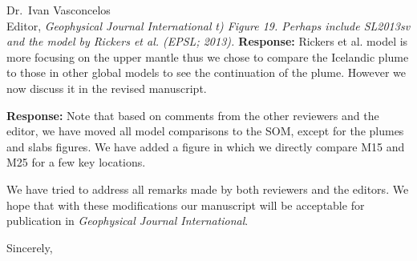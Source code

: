 \documentclass[11pt,a4paper]{letter}
\newcommand{\response}[1]{\textbf{Response:} #1}
\newcommand{\rev}[1]{{\it{#1}}}
\begin{document}
\begin{letter}{Dr.~Ivan Vasconcelos\\
Editor, \textit{Geophysical Journal International}}
\rev{t) Figure 19. Perhaps include SL2013sv and the model by Rickers et al. (EPSL; 2013).
}
\response{Rickers et al. model is more focusing on the upper mantle thus we chose to compare the Icelandic plume to those in other global models to see the continuation of the plume. However we now discuss it in the revised manuscript.}

\response{Note that based on comments from the other reviewers and the editor, we have moved
all model comparisons to the SOM, except for the plumes and slabs figures.
We have added a figure in which we directly compare M15 and M25 for a few key locations.}

We have tried to address all remarks made by both reviewers and the editors.
We hope that with these modifications our manuscript will be acceptable for publication in \textit{Geophysical Journal International}.

\closing{Sincerely,}

\end{letter} 
\end{document}
